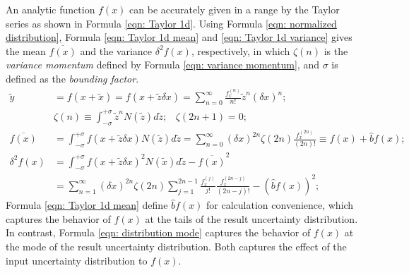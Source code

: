 \documentclass[twoside]{article}
\numberwithin{equation}{section}
\newcommand{\eqspace}{\;\;\;}
\begin{document}
An analytic function $f(x)$ can be accurately given in a range by the Taylor series as shown in Formula \eqref{eqn: Taylor 1d}.
Using Formula \eqref{eqn: normalized distribution}, Formula \eqref{eqn: Taylor 1d mean} and \eqref{eqn: Taylor 1d variance} \cite{Prev_Precision_Arithmetic} gives the mean $\overline{f(x)}$ and the variance $\delta^2 f(x)$, respectively, in which $\zeta(n)$ is the \emph{variance momentum} defined by Formula \eqref{eqn: variance momentum}, and $\sigma$ is defined as the \emph{bounding factor}.
\begin{align}
\label{eqn: Taylor 1d} 
\tilde{y} &= f(x + \tilde{x}) = f(x + \tilde{z} \delta x) = \sum_{n=0}^{\infty} \frac{f^{(n)}_x}{n!} \tilde{z}^n (\delta x)^n; \\
\label{eqn: variance momentum}
& \zeta(n) \equiv \int_{-\sigma}^{+\sigma} \tilde{z}^n N(\tilde{z}) d \tilde{z};\eqspace \zeta(2n+1) = 0; \\
\label{eqn: Taylor 1d mean}
\overline{f(x)} &= \int_{-\sigma}^{+\sigma} f(x + \tilde{z} \delta x) N(\tilde{z}) d \tilde{z}
  = \sum_{n=0}^{\infty}(\delta x)^{2n} \zeta(2n) \frac{f^{(2n)}_x}{(2n)!} \equiv f(x) + \hat{b} f(x); \\
\label{eqn: Taylor 1d variance}
\delta^2 f(x) &= \int_{-\sigma}^{+\sigma} f(x + \tilde{z} \delta x)^2 N(\tilde{x}) d \tilde{z} - \overline{f(x)}^2 \nonumber \\
 &= \sum_{n=1}^{\infty} (\delta x)^{2n} \zeta(2n) \sum_{j=1}^{2n-1} \frac{f^{(j)}_x}{j!} \frac{f^{(2n-j)}_x}{(2n-j)!} - \left( \hat{b} f(x) \right)^2; 
\end{align}
Formula \eqref{eqn: Taylor 1d mean} define $\hat{b} f(x)$ for calculation convenience, which captures the behavior of $f(x)$ at the tails of the result uncertainty distribution.
In contrast, Formula \eqref{eqn: distribution mode} captures the behavior of $f(x)$ at the mode of the result uncertainty distribution.
Both captures the effect of the input uncertainty distribution to $f(x)$.
\end{document}
